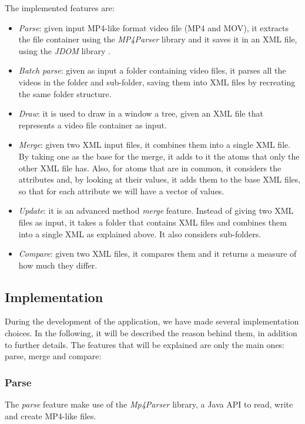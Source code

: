 The implemented features are:
\begin{itemize}
\item \emph{Parse}: given input MP4-like format video file (MP4 and MOV), it extracts the file container using the \emph{MP4Parser} library \cite{mp4parser} and it saves it in an XML file, using the \emph{JDOM} library \cite{jdom}.
\item \emph{Batch parse}: given as input a folder containing video files, it parses all the videos in the folder and sub-folder, saving them into XML files by recreating the same folder structure.
\item \emph{Draw}: it is used to draw in a window a tree, given an XML file that represents a video file container as input.
\item \emph{Merge}: given two XML input files, it combines them into a single XML file. By taking one as the base for the merge, it adds to it the atoms that only the other XML file has. Also, for atoms that are in common, it considers the attributes and, by looking at their values, it adds them to the base XML files, so that for each attribute we will have a vector of values.
\item \emph{Update}: it is an advanced method \emph{merge} feature. Instead of giving two XML files as input, it takes a folder that contains XML files and combines them into a single XML as explained above. It also considers sub-folders.
\item \emph{Compare}: given two XML files, it compares them and it returns a measure of how much they differ.
\end{itemize}

\subsection{Implementation} 
 
During the development of the application, we have made several implementation choices. In the following, it will be described the reason behind them, in addition to further details. The features that will be explained are only the main ones: parse, merge and compare:

\subsubsection*{Parse}

The \emph{parse} feature make use of the \emph{Mp4Parser} library, a Java API to read, write and create MP4-like files.

